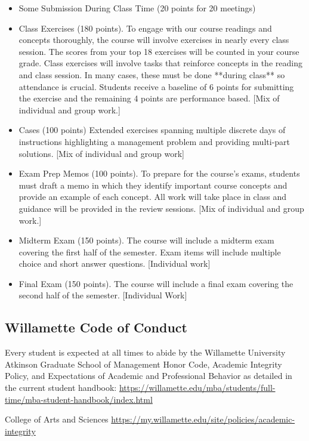 \documentclass[11pt,]{article}
\begin{document}
\begin{itemize}
\item Some Submission During Class Time (20 points for 20 meetings)
\item Class Exercises (180 points). To engage with our course readings and concepts thoroughly, the course will involve exercises in nearly every class session. The scores from your top 18 exercises will be counted in your course grade. Class exercises will involve tasks that reinforce concepts in the reading and class session.  In many cases, these must be done **during class** so attendance is crucial.  Students receive a baseline of 6 points for submitting the exercise and the remaining 4 points are performance based. [Mix of individual and group work.]
\item Cases (100 points) Extended exercises spanning multiple discrete days of instructions highlighting a management problem and providing multi-part solutions.  [Mix of individual and group work]
\item Exam Prep Memos (100 points). To prepare for the course’s exams, students must draft a memo in which they identify important course concepts and provide an example of each concept. All work will take place in class and guidance will be provided in the review sessions. [Mix of individual and group work.]
\item Midterm Exam (150 points). The course will include a midterm exam covering the first half of the semester. Exam items will include multiple choice and short answer questions. [Individual work]
\item Final Exam (150 points). The course will include a final exam covering the second half of the semester. [Individual Work]
\end{itemize}

\subsection{Willamette Code of
Conduct}\label{willamette-code-of-conduct}

Every student is expected at all times to abide by the Willamette
University Atkinson Graduate School of Management Honor Code, Academic
Integrity Policy, and Expectations of Academic and Professional Behavior
as detailed in the current student handbook:
\url{https://willamette.edu/mba/students/full-time/mba-student-handbook/index.html}

College of Arts and Sciences
\url{https://my.willamette.edu/site/policies/academic-integrity}
\end{document}
